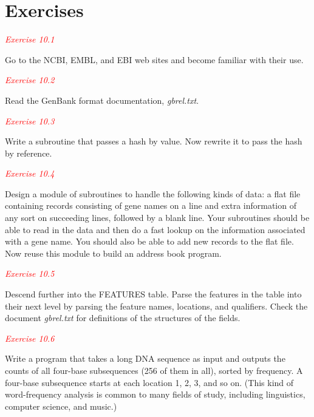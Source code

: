 \section{Exercises}
\textcolor{red}{\textit{Exercise 10.1}}
\begin{adjustwidth}{1cm}{}
Go to the NCBI, EMBL, and EBI web sites and become familiar with their use. 
\end{adjustwidth}

\textcolor{red}{\textit{Exercise 10.2}}
\begin{adjustwidth}{1cm}{}
Read the GenBank format documentation, \textit{gbrel.txt}.
\end{adjustwidth}

\textcolor{red}{\textit{Exercise 10.3}}
\begin{adjustwidth}{1cm}{}
Write a subroutine that passes a hash by value. Now rewrite it to pass the hash by reference. 
\end{adjustwidth}

\textcolor{red}{\textit{Exercise 10.4}}
\begin{adjustwidth}{1cm}{}
Design a module of subroutines to handle the following kinds of data: a flat file containing records consisting of gene names on a line and extra information of any sort on succeeding lines, followed by a blank line. Your subroutines should be able to read in the data and then do a fast lookup on the information associated with a gene name. You should also be able to add new records to the flat file. Now reuse this module to build an address book program. 
\end{adjustwidth}

\textcolor{red}{\textit{Exercise 10.5}}
\begin{adjustwidth}{1cm}{}
Descend further into the FEATURES table. Parse the features in the table into their next level by parsing the feature names, locations, and qualifiers. Check the document \textit{gbrel.txt} for definitions of the structures of the fields. 
\end{adjustwidth}

\textcolor{red}{\textit{Exercise 10.6}}
\begin{adjustwidth}{1cm}{}
Write a program that takes a long DNA sequence as input and outputs the counts of all four-base subsequences (256 of them in all), sorted by frequency. A four-base subsequence starts at each location 1, 2, 3, and so on. (This kind of word-frequency analysis is common to many fields of study, including linguistics, computer science, and music.) 
\end{adjustwidth}

